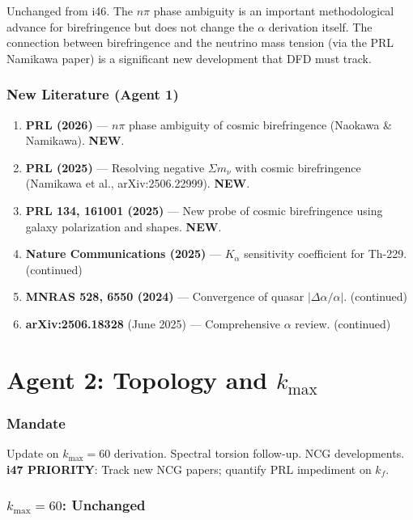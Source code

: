 \documentclass[11pt,a4paper]{article}
\newcommand{\NEW}{\textcolor{dfdblue}{\textbf{NEW}}}
\begin{document}
Unchanged from i46. The $n\pi$ phase ambiguity is an important methodological advance for birefringence but does not change the $\alpha$ derivation itself. The connection between birefringence and the neutrino mass tension (via the PRL Namikawa paper) is a significant new development that DFD must track.

\section{New Literature (Agent 1)}

\begin{enumerate}
\item \textbf{PRL (2026)} --- $n\pi$ phase ambiguity of cosmic birefringence (Naokawa \& Namikawa). \NEW.
\item \textbf{PRL (2025)} --- Resolving negative $\Sigma m_\nu$ with cosmic birefringence (Namikawa et al., arXiv:2506.22999). \NEW.
\item \textbf{PRL 134, 161001 (2025)} --- New probe of cosmic birefringence using galaxy polarization and shapes. \NEW.
\item \textbf{Nature Communications (2025)} --- $K_\alpha$ sensitivity coefficient for Th-229. (continued)
\item \textbf{MNRAS 528, 6550 (2024)} --- Convergence of quasar $|\Delta\alpha/\alpha|$. (continued)
\item \textbf{arXiv:2506.18328} (June 2025) --- Comprehensive $\alpha$ review. (continued)
\end{enumerate}


\part{Agent 2: Topology and $k_{\max}$}
\label{part:agent2}

\section{Mandate}

Update on $k_{\max} = 60$ derivation. Spectral torsion follow-up. NCG developments. \textbf{i47 PRIORITY}: Track new NCG papers; quantify PRL impediment on $k_f$.

\section{$k_{\max} = 60$: Unchanged}
\end{document}
